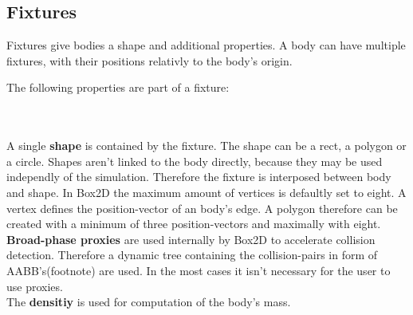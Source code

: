 \documentclass[10pt,a4paper,DIV=11]{scrreprt}
\begin{document}
\subsection{Fixtures}
Fixtures give bodies a shape and additional properties. A body can have multiple fixtures, with their positions relativly to the body's origin.

The following properties are part of a fixture:


   \\
\\

A single \textbf{shape} is contained by the fixture. The shape can be a rect, a polygon or a circle. Shapes aren't linked to the body directly, because they may be used independly of the simulation. Therefore the fixture is interposed between body and shape. In Box2D the maximum amount of vertices is defaultly set to eight. A vertex defines the position-vector of an body's edge. A polygon therefore can be created with a minimum of three position-vectors and maximally with eight.
\\

\textbf{Broad-phase proxies} are used internally by Box2D to accelerate collision detection. Therefore a dynamic tree containing the collision-pairs in form of AABB's(footnote) are used. In the most cases it isn't necessary for the user to use proxies. \\

The \textbf{densitiy} is used for computation of the body's mass.\\
\end{document}
